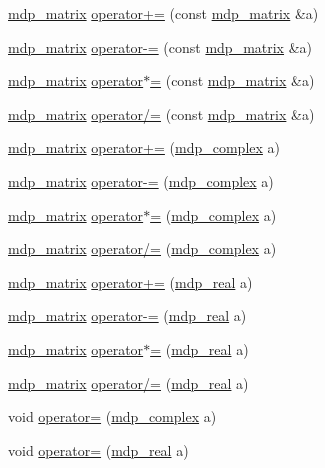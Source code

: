 \begin{DoxyCompactItemize}
\item 
\hyperlink{classmdp__matrix}{mdp\_\-matrix} \hyperlink{classmdp__matrix_a44177e84f9b728933675f171ac481a1c}{operator+=} (const \hyperlink{classmdp__matrix}{mdp\_\-matrix} \&a)
\item 
\hyperlink{classmdp__matrix}{mdp\_\-matrix} \hyperlink{classmdp__matrix_aaceb320e98a01a83350685591657861f}{operator-\/=} (const \hyperlink{classmdp__matrix}{mdp\_\-matrix} \&a)
\item 
\hyperlink{classmdp__matrix}{mdp\_\-matrix} \hyperlink{classmdp__matrix_a08052286856ff5fe01cc3cbad6553eb2}{operator$\ast$=} (const \hyperlink{classmdp__matrix}{mdp\_\-matrix} \&a)
\item 
\hyperlink{classmdp__matrix}{mdp\_\-matrix} \hyperlink{classmdp__matrix_a0c1945c09ca3bea26e1096253b49a25d}{operator/=} (const \hyperlink{classmdp__matrix}{mdp\_\-matrix} \&a)
\item 
\hyperlink{classmdp__matrix}{mdp\_\-matrix} \hyperlink{classmdp__matrix_a1021c838b49375a54f533fa97e27b742}{operator+=} (\hyperlink{classmdp__complex}{mdp\_\-complex} a)
\item 
\hyperlink{classmdp__matrix}{mdp\_\-matrix} \hyperlink{classmdp__matrix_a5512747a08a90de54f0291bb86fd3b53}{operator-\/=} (\hyperlink{classmdp__complex}{mdp\_\-complex} a)
\item 
\hyperlink{classmdp__matrix}{mdp\_\-matrix} \hyperlink{classmdp__matrix_abbab629aca4a06ab60a40087c3ddfe78}{operator$\ast$=} (\hyperlink{classmdp__complex}{mdp\_\-complex} a)
\item 
\hyperlink{classmdp__matrix}{mdp\_\-matrix} \hyperlink{classmdp__matrix_aab26bb8bce6bb9f9207e2776297c1f8d}{operator/=} (\hyperlink{classmdp__complex}{mdp\_\-complex} a)
\item 
\hyperlink{classmdp__matrix}{mdp\_\-matrix} \hyperlink{classmdp__matrix_ae2bc2fbd5f22c9a5255995710ca30c35}{operator+=} (\hyperlink{mdp__global__vars_8h_a049e4c1d4e74d644878a42f9909463e4}{mdp\_\-real} a)
\item 
\hyperlink{classmdp__matrix}{mdp\_\-matrix} \hyperlink{classmdp__matrix_a2b4c3da54d025ee8d8b48acfc8cc4702}{operator-\/=} (\hyperlink{mdp__global__vars_8h_a049e4c1d4e74d644878a42f9909463e4}{mdp\_\-real} a)
\item 
\hyperlink{classmdp__matrix}{mdp\_\-matrix} \hyperlink{classmdp__matrix_ae933b4a3f23b00dcd22f0fcf4c80379d}{operator$\ast$=} (\hyperlink{mdp__global__vars_8h_a049e4c1d4e74d644878a42f9909463e4}{mdp\_\-real} a)
\item 
\hyperlink{classmdp__matrix}{mdp\_\-matrix} \hyperlink{classmdp__matrix_abc83a95f12ed5f697213cf9d812a99cd}{operator/=} (\hyperlink{mdp__global__vars_8h_a049e4c1d4e74d644878a42f9909463e4}{mdp\_\-real} a)
\item 
void \hyperlink{classmdp__matrix_a3d8e6aca507fe6daada3b337ba2e027e}{operator=} (\hyperlink{classmdp__complex}{mdp\_\-complex} a)
\item 
void \hyperlink{classmdp__matrix_a87d932535b5e5b0f28943a76a867d983}{operator=} (\hyperlink{mdp__global__vars_8h_a049e4c1d4e74d644878a42f9909463e4}{mdp\_\-real} a)
\end{DoxyCompactItemize}
